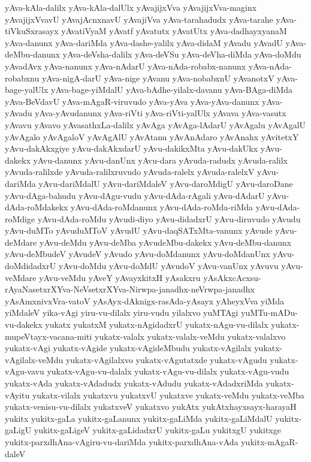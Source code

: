 {yAva-kAla-dalilx
yAva-kAla-dalUlx
yAvajijxVva
yAvajijxVva-maginx
yAvajijxVvavU
yAvajAcnxnavU
yAvajiVva
yAva-tarahadudx
yAva-tarahe
yAva-tiVkuSxrasayx
yAvatiVyaM
yAvatf
yAvatutx
yAvatUtx
yAva-dadhayxyanaM
yAva-danunx
yAva-dariMda
yAva-dashe-yalilx
yAva-didaM
yAvadu
yAvadU
yAva-deMbu-danunx
yAva-deVsha-dalilx
yAva-deVSu
yAva-deVha-diMda
yAva-doMdu
yAvadAvx
yAva-nanunx
yAva-nAdarU
yAva-nAda-robabx-nanunx
yAva-nAda-robabxnu
yAva-nigA-darU
yAva-nige
yAvanu
yAva-nobabxnU
yAvanotxV
yAva-bage-yalUlx
yAva-bage-yiMdalU
yAva-bAdhe-yilalx-davanu
yAva-BAga-diMda
yAva-BeVdavU
yAva-mAgaR-viruvudo
yAva-yAva
yAva-yAva-danunx
yAva-yAvadu
yAva-yAvudanunx
yAva-riVti
yAva-riVti-yalUlx
yAvava
yAva-vasutx
yAvavu
yAvavo
yAvasathxLa-dalilx
yAvAga
yAvAga-lAdarU
yAvAgalu
yAvAgalU
yAvAgalo
yAvAgaloV
yAvAgAlU
yAvAtanu
yAvAnAdaro
yAvAnahx
yAvitetxY
yAvu-dakAkxgiye
yAvu-dakAkxdarU
yAvu-dakikxMta
yAvu-dakUkx
yAvu-dakekx
yAvu-danunx
yAvu-danUnx
yAvu-dara
yAvuda-radudx
yAvuda-ralilx
yAvuda-ralilxde
yAvuda-ralilxruvudo
yAvuda-ralelx
yAvuda-ralelxV
yAvu-dariMda
yAvu-dariMdalU
yAvu-dariMdaleV
yAvu-daroMdigU
yAvu-daroDane
yAvu-dAga-bahudu
yAvu-dAgu-vudu
yAvu-dAda-rAgali
yAvu-dAdarU
yAvu-dAda-roMdakekx
yAvu-dAda-roMdanunx
yAvu-dAda-roMda-riMda
yAvu-dAda-roMdige
yAvu-dAda-roMdu
yAvudi-diyo
yAvu-didadxrU
yAvu-diruvudo
yAvudu
yAvu-duMTo
yAvuduMToV
yAvudU
yAvu-daqSATxMta-vanunx
yAvude
yAvu-deMdare
yAvu-deMdu
yAvu-deMba
yAvudeMbu-dakekx
yAvu-deMbu-danunx
yAvu-deMbudeV
yAvudeV
yAvudo
yAvu-doMdanunx
yAvu-doMdanUnx
yAvu-doMdidadxrU
yAvu-doMdu
yAvu-doMdU
yAvudoV
yAvu-vanUnx
yAvuvu
yAvu-veMdare
yAvu-veMdu
yAveY
yAvayxkitxH
yAsakxru
yAsAkxcAcxsu-rAyaNasetxrXYva-NeVsetxrXYva-Nirwpa-janadhx-neVrwpa-janadhx
yAsAmxnivxVra-vatoV
yAsAyx-dAknigx-rasAda-yAsayx
yAheyxVva
yiMda
yiMdaleV
yika-vAgi
yiru-vu-dilalx
yiru-vudu
yilalxvo
yuMTAgi
yuMTu-mADu-vu-dakekx
yukatx
yukatxM
yukatx-nAgidadxrU
yukatx-nAgu-vu-dilalx
yukatx-mupeVtayx-vacana-miti
yukatx-valalx
yukatx-valalx-veMdu
yukatx-valalxvo
yukatx-vAgi
yukatx-vAgide
yukatx-vAgideMbudu
yukatx-vAgilalx
yukatx-vAgilalx-veMdu
yukatx-vAgilalxvo
yukatx-vAgutatxde
yukatx-vAgudu
yukatx-vAgu-vavu
yukatx-vAgu-vu-dalalx
yukatx-vAgu-vu-dilalx
yukatx-vAgu-vudu
yukatx-vAda
yukatx-vAdadudx
yukatx-vAdudu
yukatx-vAdadxriMda
yukatx-vAyitu
yukatx-vilalx
yukatxvu
yukatxvU
yukatxve
yukatx-veMdu
yukatx-veMba
yukatx-venisu-vu-dilalx
yukatxveV
yukatxvo
yukAtx
yukAtxhayxsayx-harayaH
yukitx
yukitx-gaLa
yukitx-gaLanunx
yukitx-gaLiMda
yukitx-gaLiMdalU
yukitx-gaLigU
yukitx-gaLigeV
yukitx-gaLidadxrU
yukitx-gaLu
yukitxgU
yukitxge
yukitx-parxdhAna-vAgiru-vu-dariMda
yukitx-parxdhAna-vAda
yukitx-mAgaR-daleV
}
